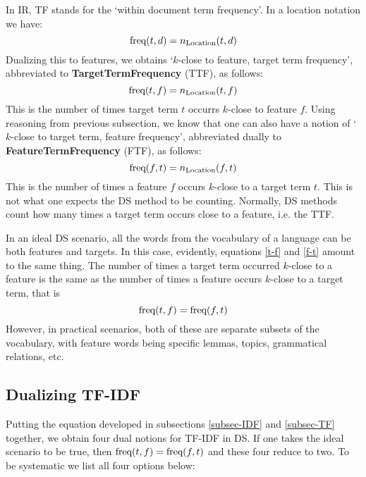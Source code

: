 In IR, TF stands for the `within document term frequency'. In a location notation we have:
\[
\textmd{freq}(t,d) = n_{\textmd{Location}}(t,d)
\]
Dualizing this to features, we obtains `$k$-close to feature, target  term frequency', abbreviated to {\bf TargetTermFrequency} (TTF), as follows:
\begin{equation}
\label{t-f}
\textmd{freq}(t,f) = n_{\textmd{Location}}(t,f)
\end{equation}
This is the number of times target  term $t$ occurrs $k$-close to feature $f$.  Using reasoning from previous subsection, we know that one can also have a notion of `$k$-close to target term, feature frequency', abbreviated dually to {\bf FeatureTermFrequency} (FTF), as follows:
\begin{equation}
\label{f-t}
\textmd{freq}(f,t) = n_{\textmd{Location}}(f,t)
\end{equation}
This is the number of times a feature $f$ occurs $k$-close to a target term $t$.  This is not what one expects the DS method to be counting. Normally, DS methods count how many times a target term occurs close to a feature, i.e. the TTF. 

In an ideal DS scenario, all the words from the vocabulary of a language can be both features and targets. In this case, evidently, equations \ref{t-f} and \ref{f-t} amount to the same thing. The number of times a target term occurred $k$-close to a feature is the same as the number of times a feature occurs $k$-close to a target term, that is
\begin{equation}
\label{ttf=ftf}
\textmd{freq}(t,f) = \textmd{freq}(f,t) 
\end{equation}
However, in practical scenarios, both of these are separate subsets of the vocabulary, with feature words being specific lemmas, topics, grammatical relations, etc. 

\subsection{Dualizing TF-IDF}
\label{subsec-TF-IDF}

Putting  the equation developed in subsections \ref{subsec-IDF} and \ref{subsec-TF} together,  we obtain four dual notions  for TF-IDF in DS. If one takes the  ideal scenario to be true, then  $\textmd{freq}(t,f) = \textmd{freq}(f,t)$ and these four reduce to  two.  To be systematic we list all four options below: 


